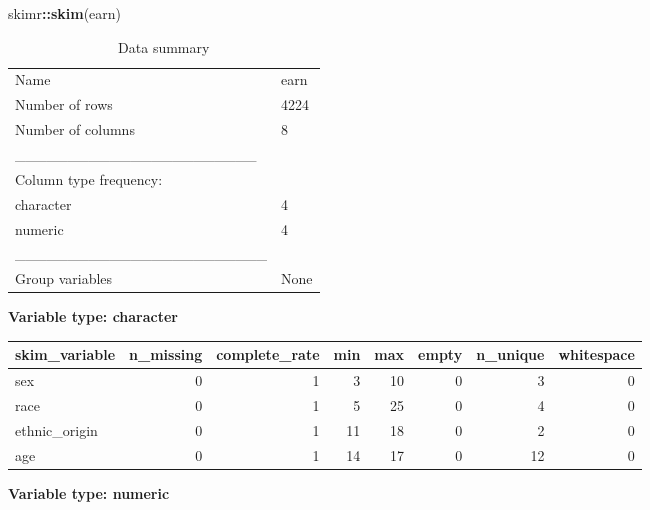 \documentclass[
]{article}
\newenvironment{Shaded}{\begin{snugshade}}{\end{snugshade}}
\newcommand{\KeywordTok}[1]{\textcolor[rgb]{0.13,0.29,0.53}{\textbf{#1}}}
\newcommand{\NormalTok}[1]{#1}
\newcommand{\OperatorTok}[1]{\textcolor[rgb]{0.81,0.36,0.00}{\textbf{#1}}}
\begin{document}
\begin{Shaded}
\begin{Highlighting}[]
\NormalTok{skimr}\OperatorTok{::}\KeywordTok{skim}\NormalTok{(earn)}
\end{Highlighting}
\end{Shaded}

\begin{longtable}[]{@{}ll@{}}
\caption{Data summary}\tabularnewline
\toprule
\endhead
Name & earn\tabularnewline
Number of rows & 4224\tabularnewline
Number of columns & 8\tabularnewline
\_\_\_\_\_\_\_\_\_\_\_\_\_\_\_\_\_\_\_\_\_\_\_ &\tabularnewline
Column type frequency: &\tabularnewline
character & 4\tabularnewline
numeric & 4\tabularnewline
\_\_\_\_\_\_\_\_\_\_\_\_\_\_\_\_\_\_\_\_\_\_\_\_ &\tabularnewline
Group variables & None\tabularnewline
\bottomrule
\end{longtable}

\textbf{Variable type: character}

\begin{longtable}[]{@{}lrrrrrrr@{}}
\toprule
skim\_variable & n\_missing & complete\_rate & min & max & empty &
n\_unique & whitespace\tabularnewline
\midrule
\endhead
sex & 0 & 1 & 3 & 10 & 0 & 3 & 0\tabularnewline
race & 0 & 1 & 5 & 25 & 0 & 4 & 0\tabularnewline
ethnic\_origin & 0 & 1 & 11 & 18 & 0 & 2 & 0\tabularnewline
age & 0 & 1 & 14 & 17 & 0 & 12 & 0\tabularnewline
\bottomrule
\end{longtable}

\textbf{Variable type: numeric}
\end{document}
